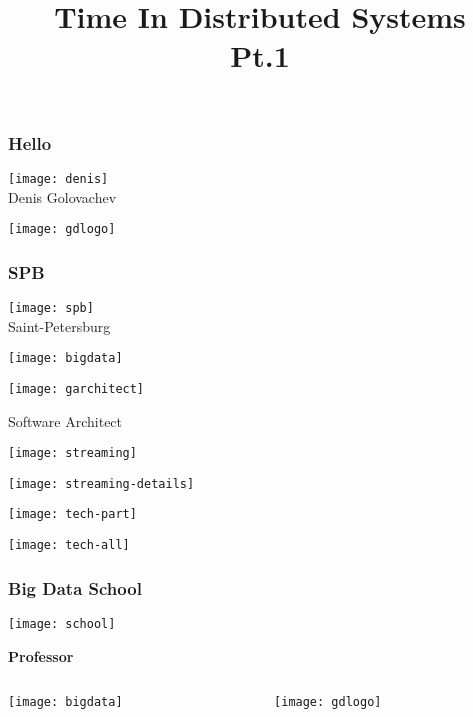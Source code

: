 \documentclass[aspectratio=169, 15pt,usenames,dvipsnames]{beamer}
\title{Time In Distributed Systems\\Pt.1}
\begin{document}
   
	\begin{titlePage} 
		\titlepage        
	\end{titlePage}
		
	\begin{gdblank}
		\frametitle{Hello}
		\centering\texttt{[image: denis]}
		\\Denis Golovachev
	\end{gdblank} 
	\begin{gdblank}
		\centering\texttt{[image: gdlogo]}
	\end{gdblank}
	\begin{gdblank}
		\frametitle{SPB}
		\centering\texttt{[image: spb]}
		\\Saint-Petersburg
	\end{gdblank}
	\begin{gdblank}
		\centering\texttt{[image: bigdata]} 
	\end{gdblank}
	\begin{gdblank}
		\centering\texttt{[image: garchitect]} 
		\par\LARGE
		Software Architect
	\end{gdblank}
	\begin{gdblank}
		\centering\texttt{[image: streaming]} 
	\end{gdblank}
	\begin{gdblank}
		\centering\texttt{[image: streaming-details]} 
	\end{gdblank}
	\begin{gdblank}
		\centering\texttt{[image: tech-part]} 
	\end{gdblank}
	\begin{gdblank}
		\centering\texttt{[image: tech-all]} 
	\end{gdblank}
	\begin{gdblank}
		\frametitle{Big Data School}
		\centering\texttt{[image: school]}
		\par\LARGE
		\pause
		\textbf{
			Professor
		}		
	\end{gdblank}
	\begin{gdblank}
		\centering{\fontsize{100pt}{120pt}\selectfont\bf Boring}
	\end{gdblank}   
	\begin{gdblank}
		\begin{columns}
			\begin{column}{0.5\textwidth}
				\centering\texttt{[image: bigdata]}
			\end{column}
			\begin{column}{0.5\textwidth}
				\centering\texttt{[image: gdlogo]}
			\end{column}
		\end{columns}   
	\end{gdblank}
\end{document}
